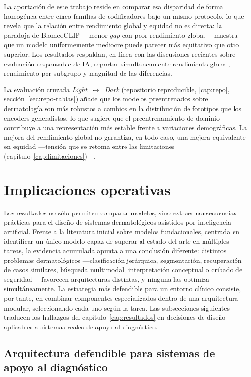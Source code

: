 La aportación de este trabajo reside en comparar esa disparidad de forma
homogénea entre cinco familias de codificadores bajo un mismo protocolo,
lo que revela que la relación entre rendimiento global y equidad no es
directa: la paradoja de BiomedCLIP ---menor \emph{gap} con peor
rendimiento global--- muestra que un modelo uniformemente mediocre puede
parecer más equitativo que otro superior. Los resultados respaldan, en
línea con las discusiones recientes sobre evaluación responsable de IA,
reportar simultáneamente rendimiento global, rendimiento por subgrupo y
magnitud de las diferencias.

La evaluación cruzada \emph{Light}~$\leftrightarrow$~\emph{Dark}
(repositorio reproducible, \ref{cap:repo}, sección~\ref{sec:repo-tablas})
añade que los modelos preentrenados sobre dermatología son más robustos
a cambios en la distribución de fototipos que los encoders generalistas,
lo que sugiere que el preentrenamiento de dominio contribuye a una
representación más estable frente a variaciones demográficas. La mejora
del rendimiento global no garantiza, en todo caso, una mejora
equivalente en equidad ---tensión que se retoma entre las limitaciones
(capítulo~\ref{cap:limitaciones})---.

\section{Implicaciones operativas}
\label{sec:implicaciones}

Los resultados no sólo permiten comparar modelos, sino extraer
consecuencias prácticas para el diseño de sistemas dermatológicos
asistidos por inteligencia artificial. Frente a la literatura inicial
sobre modelos fundacionales, centrada en identificar un único modelo
capaz de superar al estado del arte en múltiples tareas, la evidencia
acumulada apunta a una conclusión diferente: distintos problemas
dermatológicos ---clasificación jerárquica, segmentación, recuperación
de casos similares, búsqueda multimodal, interpretación conceptual o
cribado de seguridad--- favorecen arquitecturas distintas, y ninguna las
optimiza simultáneamente. La estrategia más defendible para un entorno
clínico consiste, por tanto, en combinar componentes especializados
dentro de una arquitectura modular, seleccionando cada uno según la
tarea. Las subsecciones siguientes traducen los hallazgos del
capítulo~\ref{cap:resultados} en decisiones de diseño aplicables a
sistemas reales de apoyo al diagnóstico.

\subsection{Arquitectura defendible para sistemas de apoyo al diagnóstico}
\label{sec:disc-arq}

